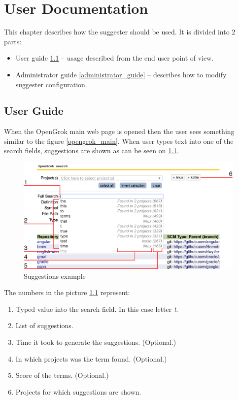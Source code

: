 \chapter{User Documentation}
\label{chap:user}

This chapter describes how the suggester should be used. It is divided into 2 parts:
\begin{itemize}
    \item User guide \ref{user_guide} – usage described from the end user point of view.
    \item Administrator guide \ref{administrator_guide} – describes how to modify suggester configuration.
\end{itemize}

\section{User Guide}
\label{user_guide}
When the OpenGrok main web page is opened then the user sees something similar to the figure \ref{opengrok_main}.
When user types text into one of the search fields, suggestions are shown as can be seen on \ref{suggestions_pic}.

\begin{figure}[htbp]
    \centering
    \includegraphics[width=145mm]{../img/suggestions_pic.png}
    \caption{Suggestions example}
    \label{suggestions_pic}
\end{figure}

The numbers in the picture \ref{suggestions_pic} represent:
\begin{enumerate}
    \item Typed value into the search field. In this case letter \textit{t}.
    \item List of suggestions.
    \item Time it took to generate the suggestions. (Optional.)
    \item In which projects was the term found. (Optional.)
    \item Score of the terms. (Optional.)
    \item Projects for which suggestions are shown.
\end{enumerate}

